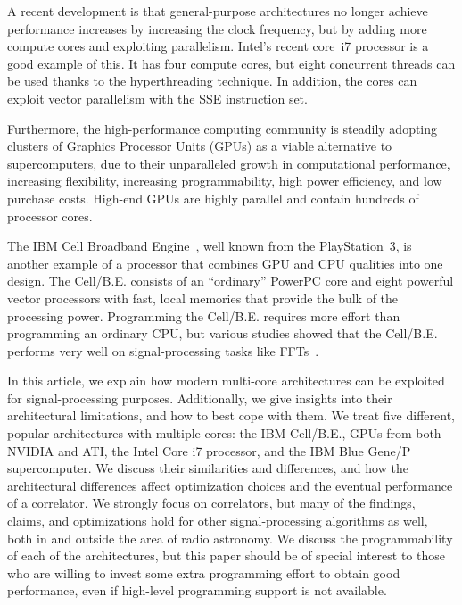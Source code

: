 \documentclass{article}
\begin{document}
A recent development is that general-purpose architectures no longer
achieve performance increases by increasing the clock frequency, but
by adding more compute cores and exploiting parallelism.  Intel's
recent core~i7 processor is a good example of this. It has four
compute cores, but eight concurrent threads can be used thanks to the
hyperthreading technique. In addition, the cores can exploit vector
parallelism with the SSE instruction set.

Furthermore, the high-performance computing community is
steadily adopting clusters of Graphics Processor Units (GPUs) as a viable
alternative to supercomputers, due to their unparalleled growth in
computational performance, increasing flexibility, increasing programmability,
high power efficiency, and low purchase costs.
High-end GPUs are highly parallel and contain hundreds of processor cores.

The IBM Cell Broadband Engine~\cite{Gschwind:06}, well known from the
PlayStation~3, is another example of a processor that combines GPU and CPU
qualities into one design.
The Cell/B.E. consists of an ``ordinary'' PowerPC core and eight powerful
vector processors with fast, local memories that provide
the bulk of the processing power.
Programming the Cell/B.E. requires more effort than programming an ordinary CPU,
but various studies showed that the Cell/B.E. performs very well on
signal-processing tasks like FFTs~\cite{fftc}.

In this article, we explain how modern multi-core architectures can be
exploited for signal-processing purposes.  Additionally, we give
insights into their architectural limitations, and how to best cope
with them.  We treat five different, popular architectures with
multiple cores: the IBM Cell/B.E., GPUs from both NVIDIA and ATI, the Intel Core i7 processor, and
the IBM Blue Gene/P supercomputer.  We discuss their
similarities and differences, and how the architectural differences
affect optimization choices and the eventual performance of a
correlator.  We strongly focus on correlators, but many of the
findings, claims, and optimizations hold for other signal-processing
algorithms as well, both in and outside the area of radio astronomy.
We discuss the programmability of each of the architectures, but this
paper should be of special interest to those who are willing to invest
some extra programming effort to obtain good performance, even if
high-level programming support is not available.
\end{document}

